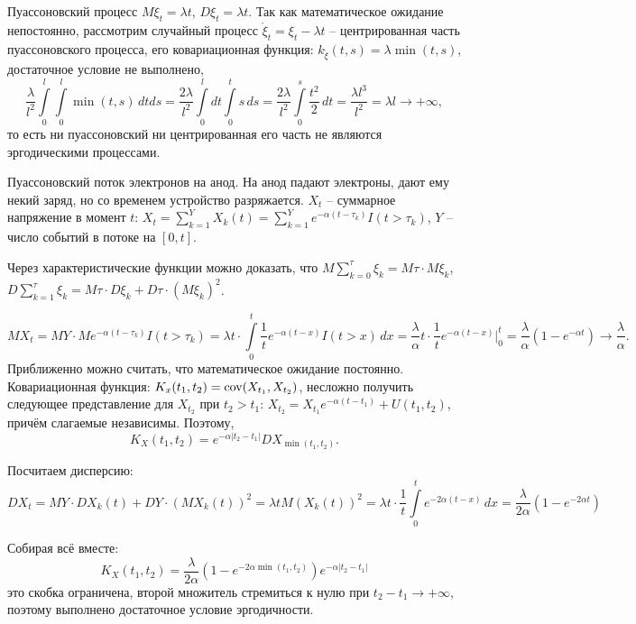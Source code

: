 \begin{ex}
  Пуассоновский процесс $M\xi_t = \lambda t$, $D\xi_t = \lambda t$.
  Так как математическое ожидание непостоянно, рассмотрим случайный процесс
  $\mathring{\xi}_t = \xi_t - \lambda t$ -- центрированная часть пуассоновского процесса, 
  его ковариационная функция: $k_{\mathring{\xi}}(t, s) = \lambda \min(t, s)$, достаточное условие не выполнено,
  \[
    \dfrac{\lambda}{l^2} \int\limits_0^l \int\limits_0^l \min(t, s) \, dt ds
    = \dfrac{2\lambda}{l^2} \int\limits_0^l dt \int\limits_0^t s \, ds
    = \dfrac{2\lambda}{l^2} \int\limits_0^s \dfrac{t^2}{2} \, dt
    = \dfrac{\lambda l^3}{l^2} = \lambda l \to +\infty,
  \]
  то есть ни пуассоновский ни центрированная его часть не являются эргодическими процессами.
\end{ex}

\begin{ex}
  Пуассоновский поток электронов на анод. На анод падают электроны, дают ему некий заряд,
  но со временем устройство разряжается. $X_t$ -- суммарное напряжение в момент $t$:
  $X_t = \sum_{k=1}^{Y} X_k(t) = \sum_{k=1}^{Y} e^{-\alpha (t-\tau_k)} I(t > \tau_k)$, $Y$ --
  число событий в потоке на $[0, t]$.

  Через характеристические функции можно доказать, что $M \sum_{k=0}^\tau \xi_k = M\tau \cdot M\xi_k$, $D \sum_{k=1}^\tau \xi_k = M\tau \cdot D \xi_k + D\tau \cdot \left( M\xi_k \right)^2$.

  \[
    MX_t = MY \cdot M e^{-\alpha(t-\tau_k)} I(t > \tau_k) = \lambda t \cdot \int\limits_0^t \dfrac{1}{t} e^{-\alpha(t-x)} I(t > x) \, dx
    = \dfrac{\lambda}{\alpha} t \cdot \dfrac{1}{t} e^{-\alpha (t-x)} |_0^t
    = \dfrac{\lambda}{\alpha} \left( 1 - e^{-\alpha t} \right) \to \dfrac{\lambda}{\alpha}.
  \]
  Приближенно можно считать, что математическое ожидание постоянно.
  Ковариационная функция: $K_x (t_1, t_2) = \operatorname{cov} (X_{t_1}, X_{t_2})$,
  несложно получить следующее представление для $X_{t_2}$ при $t_2 > t_1$:
  $X_{t_2} = X_{t_1} e^{-\alpha(t - t_1)} + U(t_1, t_2)$, 
  причём слагаемые независимы. Поэтому,
  \[
    K_X(t_1, t_2) = e^{-\alpha |t_2-t_1|} DX_{\min(t_1, t_2)}.
  \]

  Посчитаем дисперсию:
  \[
    DX_t = MY \cdot DX_k(t) + DY \cdot (MX_k(t))^2
    = \lambda t M \left( X_k(t) \right)^2
    = \lambda t \cdot \dfrac{1}{t} \int\limits_0^t e^{-2\alpha(t-x)} \, dx
    = \dfrac{\lambda}{2\alpha} \left( 1 - e^{-2\alpha t} \right) 
  \]

  Собирая всё вместе:
  \[
    K_X(t_1, t_2) = \dfrac{\lambda}{2\alpha} \left(1 - e^{-2\alpha \min(t_1, t_2)}\right)
    e^{-\alpha |t_2-t_1|}
  \]
  это скобка ограничена, второй множитель стремиться к нулю при $t_2 - t_1 \to +\infty$,
  поэтому выполнено достаточное условие эргодичности.
\end{ex}

